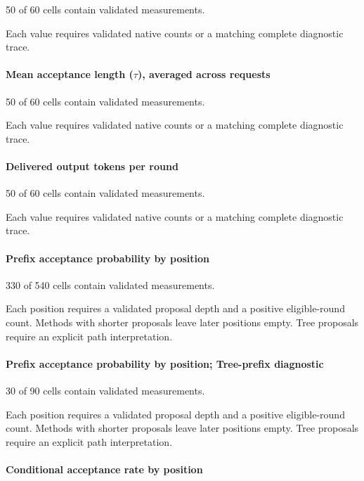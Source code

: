 \documentclass[conference,onecolumn]{IEEEtran}
\begin{document}
50 of 60 cells contain validated measurements.

Each value requires validated native counts or a matching complete diagnostic trace.

\paragraph*{Mean acceptance length (\(\tau\)), averaged across requests}

50 of 60 cells contain validated measurements.

Each value requires validated native counts or a matching complete diagnostic trace.

\paragraph*{Delivered output tokens per round}

50 of 60 cells contain validated measurements.

Each value requires validated native counts or a matching complete diagnostic trace.

\paragraph*{Prefix acceptance probability by position}

330 of 540 cells contain validated measurements.

Each position requires a validated proposal depth and a positive eligible-round count. Methods with shorter proposals leave later positions empty. Tree proposals require an explicit path interpretation.

\paragraph*{Prefix acceptance probability by position; Tree-prefix diagnostic}

30 of 90 cells contain validated measurements.

Each position requires a validated proposal depth and a positive eligible-round count. Methods with shorter proposals leave later positions empty. Tree proposals require an explicit path interpretation.

\paragraph*{Conditional acceptance rate by position}
\end{document}
